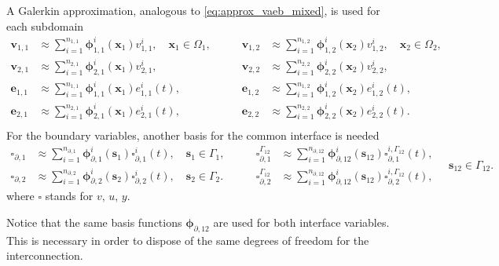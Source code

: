 A Galerkin approximation, analogous to \eqref{eq:approx_vaeb_mixed}, is used for each subdomain
\begin{equation}
\begin{aligned}
\bm{v}_{1, 1} &\approx \sum_{i=1}^{n_{1, 1}} \bm{\phi}_{1, 1}^i(\bm{x}_1) v_{1, 1}^i, \quad \bm{x}_1 \in \Omega_1, \\
\bm{v}_{2, 1} &\approx \sum_{i=1}^{n_{2, 1}} \bm{\phi}_{2, 1}^i(\bm{x}_1) v_{2, 1}^i, \\
\bm{e}_{1, 1} &\approx \sum_{i=1}^{n_{1, 1}} \bm{\phi}_{1, 1}^i(\bm{x}_1) e_{1, 1}^i(t), \\
\bm{e}_{2, 1} &\approx \sum_{i=1}^{n_{2, 1}} \bm{\phi}_{2, 1}^i(\bm{x}_1) e_{2, 1}^i(t),  \\
\end{aligned}  \qquad 
\begin{aligned}
\bm{v}_{1, 2} &\approx \sum_{i=1}^{n_{1, 2}} \bm{\phi}_{1, 2}^i(\bm{x}_2) v_{1, 2}^i, \quad \bm{x}_2 \in \Omega_2, \\
\bm{v}_{2, 2} &\approx \sum_{i=1}^{n_{2, 2}} \bm{\phi}_{2, 2}^i(\bm{x}_2) v_{2, 2}^i, \\
\bm{e}_{1, 2} &\approx \sum_{i=1}^{n_{1, 2}} \bm{\phi}_{1, 2}^i(\bm{x}_2) e_{1, 2}^i(t), \\
\bm{e}_{2, 2} &\approx \sum_{i=1}^{n_{2, 2}} \bm{\phi}_{2, 2}^i(\bm{x}_2) e_{2, 2}^i(t).  \\
\end{aligned} 
\end{equation}
For the boundary variables, another basis for the common interface is needed 
\begin{equation}\label{eq:approx_vuy_int}
\begin{aligned}
\bm{\square}_{\partial, 1} &\approx \sum_{i=1}^{n_{\partial, 1}} \bm{\phi}_{\partial, 1}^i(\bm{s}_1) \square_{\partial, 1}^i(t), \quad \bm{s}_1 \in \Gamma_1, \\
\bm{\square}_{\partial, 2} &\approx \sum_{i=1}^{n_{\partial, 2}} \bm{\phi}_{\partial, 2}^i(\bm{s}_2) \square_{\partial, 2}^i(t), \quad \bm{s}_2 \in \Gamma_2.
\end{aligned} \qquad
\begin{aligned}
\bm{\square}_{\partial, 1}^{\Gamma_{12}} &\approx \sum_{i=1}^{n_{\partial, 12}} \bm{\phi}_{\partial, 12}^i(\bm{s}_{12}) \square_{\partial, 1}^{i, \Gamma_{12}}(t), \\
\bm{\square}_{\partial, 2}^{\Gamma_{12}}  &\approx \sum_{i=1}^{n_{\partial, 12}} \bm{\phi}_{\partial, 12}^i(\bm{s}_{12}) \square_{\partial, 2}^{i, \Gamma_{12}}(t), 
\end{aligned} \quad \bm{s}_{12} \in \Gamma_{12}.
\end{equation}
where $\square$ stands for $v,\, u,\, y$. 
\begin{remark}
Notice that the same basis functions $\bm{\phi}_{\partial, 12}$ are used for both interface variables. This is necessary in order to dispose of the same degrees of freedom for the interconnection.
\end{remark}

